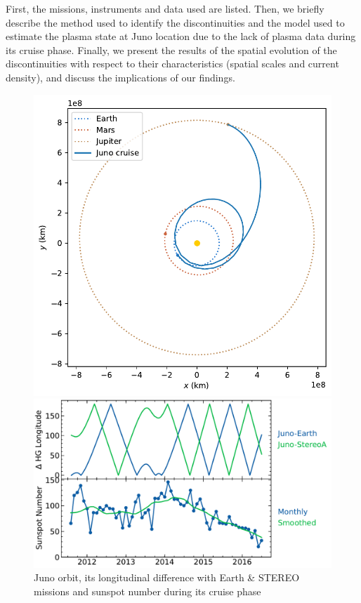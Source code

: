 \documentclass[
]{agujournal2019}
\begin{document}
First, the missions, instruments and data used are listed. Then, we brieﬂy describe the method used to identify the discontinuities and the model used to estimate the plasma state at Juno location due to the lack of plasma data during its cruise phase. Finally, we present the results of the spatial evolution of the discontinuities with respect to their characteristics (spatial scales and current density), and discuss the implications of our findings.

\begin{figure}

\begin{minipage}{\linewidth}
\includegraphics{figures/juno_orbit_white.pdf}\end{minipage}%
\newline
\begin{minipage}{\linewidth}
\includegraphics{figures/juno-hg-loc_sunspot-number.pdf}\end{minipage}%

\caption{\label{fig-overview}Juno orbit, its longitudinal difference with Earth \& STEREO missions and sunspot number during its cruise phase}

\end{figure}%
\end{document}
